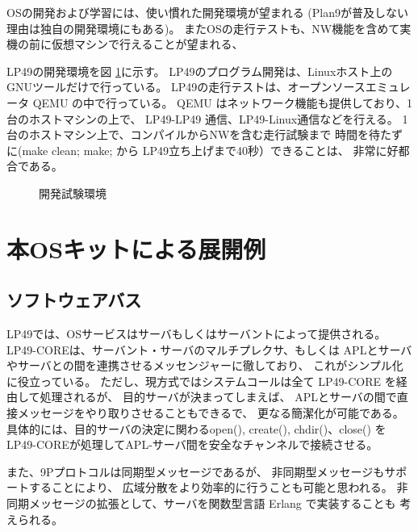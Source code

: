 \documentclass{jarticle}
\begin{document}
OSの開発および学習には、使い慣れた開発環境が望まれる
(Plan9が普及しない理由は独自の開発環境にもある)。
またOSの走行テストも、NW機能を含めて実機の前に仮想マシンで行えることが望まれる、

LP49の開発環境を図 \ref{fig:SDE}に示す。
LP49のプログラム開発は、Linuxホスト上の GNUツールだけで行っている。
LP49の走行テストは、オープンソースエミュレータ QEMU の中で行っている。
QEMU はネットワーク機能も提供しており、1台のホストマシンの上で、
LP49-LP49 通信、LP49-Linux通信などを行える。
1台のホストマシン上で、コンパイルからNWを含む走行試験まで
時間を待たずに(make clean; make; から LP49立ち上げまで40秒）できることは、
非常に好都合である。


\begin{figure}[htb]
  \begin{center}
   \epsfxsize=360pt
    \caption{開発試験環境}
    \label{fig:SDE}
  \end{center}
\end{figure}


\section{本OSキットによる展開例}

\subsection{ソフトウェアバス}

LP49では、OSサービスはサーバもしくはサーバントによって提供される。
LP49-COREは、サーバント・サーバのマルチプレクサ、もしくは
APLとサーバやサーバとの間を連携させるメッセンジャーに徹しており、
これがシンプル化に役立っている。
ただし、現方式ではシステムコールは全て LP49-CORE を経由して処理されるが、
目的サーバが決まってしまえば、
APLとサーバの間で直接メッセージをやり取りさせることもできるで、
更なる簡潔化が可能である。
具体的には、目的サーバの決定に関わるopen(), create(), chdir()、close() を
LP49-COREが処理してAPL-サーバ間を安全なチャンネルで接続させる。

また、9Pプロトコルは同期型メッセージであるが、
非同期型メッセージもサポートすることにより、
広域分散をより効率的に行うことも可能と思われる。
非同期メッセージの拡張として、サーバを関数型言語 Erlang で実装することも
考えられる。


\begin{comment}
図 \ref{fig:simpleOS}

\begin{figure}[htb]
  \begin{center}
   \epsfxsize=400pt
   \epsfbox{fig/simpleOS.eps}
    \caption{簡明なOS構成}
    \label{fig:simpleOS}
  \end{center}
\end{figure}
\end{comment}
\end{document}
